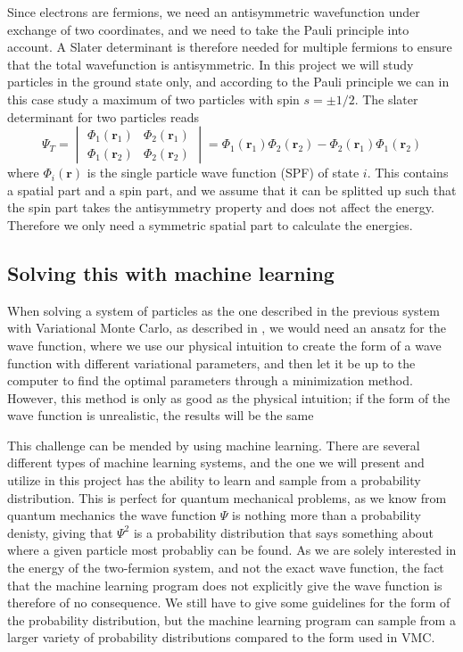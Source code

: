 \documentclass[norsk,a4paper,12pt]{article}
\begin{document}
Since electrons are fermions, we need an antisymmetric wavefunction under exchange of two coordinates, and we need to take the Pauli principle into account. A Slater determinant is therefore needed for multiple fermions to ensure that the total wavefunction is antisymmetric. In this project we will study particles in the ground state only, and according to the Pauli principle we can in this case study a maximum of two particles with spin $s=\pm 1/2$. The slater determinant for two particles reads
\begin{equation}
\Psi_T=
\begin{vmatrix}
\Phi_1(\boldsymbol{r}_1) & \Phi_2(\boldsymbol{r}_1)\\
\Phi_1(\boldsymbol{r}_2) & \Phi_2(\boldsymbol{r}_2)
\end{vmatrix}
=\Phi_1(\boldsymbol{r}_1)\Phi_2(\boldsymbol{r}_2)-\Phi_2(\boldsymbol{r}_1)\Phi_1(\boldsymbol{r}_2)
\end{equation}
where $\Phi_i(\boldsymbol{r})$ is the single particle wave function (SPF) of state $i$. This contains a spatial part and a spin part, and we assume that it can be splitted up such that the spin part takes the antisymmetry property and does not affect the energy. Therefore we only need a symmetric spatial part to calculate the energies.

\subsection{Solving this with machine learning}
When solving a system of particles as the one described in the previous system with Variational Monte Carlo, as described in \cite{Nordhagen}, we would need an ansatz for the wave function, where we use our physical intuition to create the form of a wave function with different variational parameters, and then let it be up to the computer to find the optimal parameters through a minimization method. However, this method is only as good as the physical intuition; if the form of the wave function is unrealistic, the results will be the same
\par 
\vspace{3mm}
This challenge can be mended by using machine learning. There are several different types of machine learning systems, and the one we will present and utilize in this project has the ability to learn and sample from a probability distribution. This is perfect for quantum mechanical problems, as we know from quantum mechanics the wave function $\Psi$ is nothing more than a probability denisty, giving that $\Psi^2$ is a probability distribution that says something about where a given particle most probabliy can be found. As we are solely interested in the energy of the two-fermion system, and not the exact wave function, the fact that the machine learning program does not explicitly give the wave function is therefore of no consequence. We still have to give some guidelines for the form of the probability distribution, but the machine learning program can sample from a larger variety of probability distributions compared to the form used in VMC.
\end{document}
